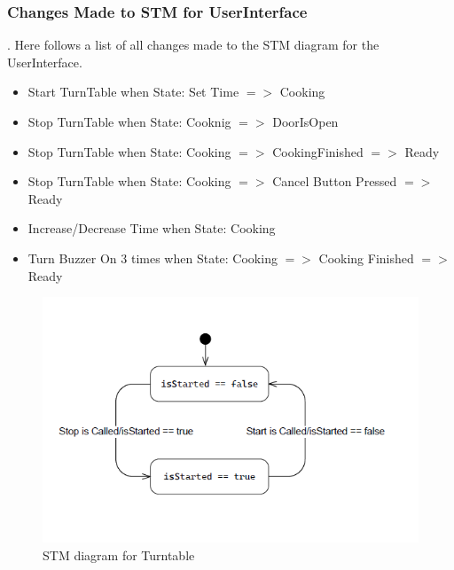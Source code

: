 \subsubsection{Changes Made to STM for UserInterface}.
Here follows a list of all changes made to the STM diagram for the UserInterface.

\begin{itemize}
  \item Start TurnTable when State: Set Time $=>$ Cooking
  \item Stop TurnTable when State: Cooknig $=>$ DoorIsOpen
  \item Stop TurnTable when State: Cooking $=>$ CookingFinished $=>$ Ready
  \item Stop TurnTable when State: Cooking $=>$ Cancel Button Pressed $=>$ Ready
  \item Increase/Decrease Time when State: Cooking
  \item Turn Buzzer On 3 times when State: Cooking $=>$ Cooking Finished $=>$ Ready 
\end{itemize}

\newpage
\begin{figure}[h]
  \centering
  \includegraphics[scale=0.6]{02-Body/Image/TurntableSTM.PNG}
  \caption{STM diagram for Turntable}%
  \label{fig:TurntableSTM}
\end{figure}

